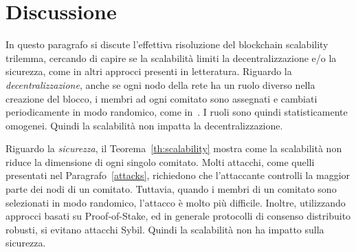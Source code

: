 \section{Discussione}

In questo paragrafo si discute l'effettiva risoluzione del blockchain scalability trilemma, cercando di capire se la scalabilità limiti la decentralizzazione e/o la sicurezza, come in altri approcci presenti in letteratura.
Riguardo la \textit{decentralizzazione}, anche se ogni nodo della rete ha un ruolo diverso nella creazione del blocco, i membri ad ogni comitato sono assegnati e cambiati periodicamente in modo randomico, come in~\cite{gilad2017algorand}.
I ruoli sono quindi statisticamente omogenei. Quindi la scalabilità non impatta la decentralizzazione.

Riguardo la \textit{sicurezza}, il Teorema~\ref{th:scalability} mostra come la scalabilità non riduce la dimensione di ogni singolo comitato. Molti attacchi, come quelli presentati nel Paragrafo~\ref{attacks}, richiedono che l'attaccante controlli la maggior parte dei nodi di un comitato. Tuttavia, quando i membri di un comitato sono selezionati in modo randomico, l'attacco è molto più difficile. Inoltre, utilizzando approcci basati su Proof-of-Stake, ed in generale protocolli di consenso distribuito robusti, si evitano attacchi Sybil. Quindi la scalabilità non ha impatto sulla sicurezza.
